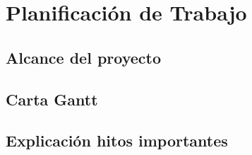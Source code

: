 \section{Planificación de Trabajo}

\subsection{Alcance del proyecto}

\subsection{Carta Gantt}

\subsection{Explicación hitos importantes}
